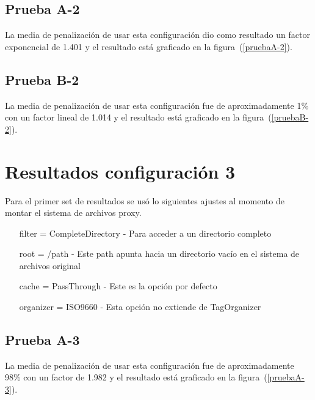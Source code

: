 \subsection{Prueba A-2}

La media de penalización de usar esta configuración dio como resultado un factor exponencial de 1.401 y el resultado está graficado en la figura~(\ref{pruebaA-2}).


\subsection{Prueba B-2}

La media de penalización de usar esta configuración fue de aproximadamente 1\% con un factor lineal de 1.014 y el resultado está graficado en la figura~(\ref{pruebaB-2}).


\section{Resultados configuración 3}

Para el primer set de resultados se usó lo siguientes ajustes al momento de montar el sistema de archivos proxy.

\begin{itemize}
\item[filter] = CompleteDirectory - Para acceder a un directorio completo
\item[root] = /path - Este path apunta hacia un directorio vacío en el sistema de archivos original
\item[cache] = PassThrough - Este es la opción por defecto
\item[organizer] = ISO9660 - Esta opción no extiende de TagOrganizer
\end{itemize}

\subsection{Prueba A-3}

La media de penalización de usar esta configuración fue de aproximadamente 98\% con un factor de 1.982 y el resultado está graficado en la figura~(\ref{pruebaA-3}).

